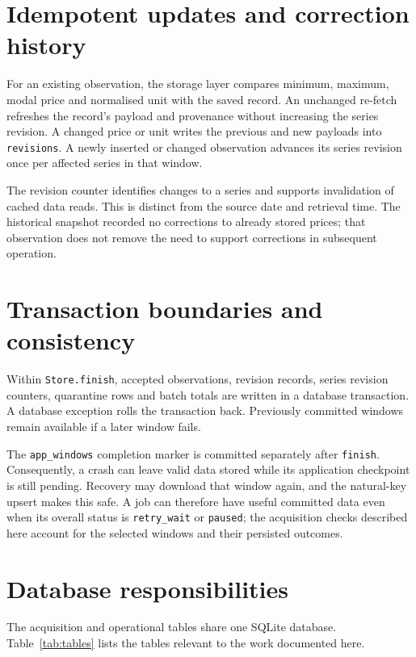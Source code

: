 \documentclass[12pt,a4paper,oneside]{report}
\numberwithin{equation}{chapter}
\numberwithin{figure}{chapter}
\numberwithin{table}{chapter}
\theoremstyle{definition}
\begin{document}
\section{Idempotent updates and correction history}
For an existing observation, the storage layer compares minimum, maximum, modal price and normalised unit with the saved record. An unchanged re-fetch refreshes the record's payload and provenance without increasing the series revision. A changed price or unit writes the previous and new payloads into \texttt{revisions}. A newly inserted or changed observation advances its series revision once per affected series in that window.

The revision counter identifies changes to a series and supports invalidation of cached data reads. This is distinct from the source date and retrieval time. The historical snapshot recorded no corrections to already stored prices; that observation does not remove the need to support corrections in subsequent operation.

\section{Transaction boundaries and consistency}
Within \texttt{Store.finish}, accepted observations, revision records, series revision counters, quarantine rows and batch totals are written in a database transaction. A database exception rolls the transaction back. Previously committed windows remain available if a later window fails.

The \texttt{app\_windows} completion marker is committed separately after \texttt{finish}. Consequently, a crash can leave valid data stored while its application checkpoint is still pending. Recovery may download that window again, and the natural-key upsert makes this safe. A job can therefore have useful committed data even when its overall status is \texttt{retry\_wait} or \texttt{paused}; the acquisition checks described here account for the selected windows and their persisted outcomes.

\section{Database responsibilities}
The acquisition and operational tables share one SQLite database. Table~\ref{tab:tables} lists the tables relevant to the work documented here.
\end{document}

